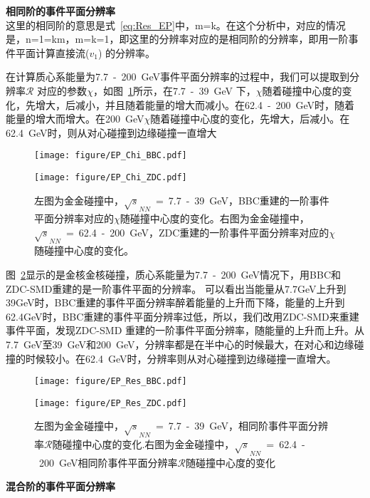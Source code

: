 
\textbf{ 相同阶的事件平面分辨率} \\

这里的相同阶的意思是式~\ref{eq:Res_EP}中，m=k。在这个分析中，对应的情况是，n=1=km，m=k=1，即这里的分辨率对应的是相同阶的分辨率，即用一阶事件平面计算直接流($v_{1}$) 的分辨率。

在计算质心系能量为7.7~-~200~GeV事件平面分辨率的过程中，我们可以提取到分辨率$\mathcal{R}$ 对应的参数$\chi$，如图~\ref{fig:EP_Chi_BBC_ZDC}所示，在7.7~-~39~GeV 下，$\chi$随着碰撞中心度的变化，先增大，后减小，并且随着能量的增大而减小。在62.4~-~200~GeV时，随着能量的增大而增大。在200~GeV$\chi$随着碰撞中心度的变化，先增大，后减小。在62.4~GeV时，则从对心碰撞到边缘碰撞一直增大

\begin{figure}[htbp]
\begin{minipage}[t]{0.5\textwidth}
\centering
\texttt{[image: figure/EP\_Chi\_BBC.pdf]}
\end{minipage}
\begin{minipage}[t]{0.5\textwidth}
\centering
\texttt{[image: figure/EP\_Chi\_ZDC.pdf]}
\end{minipage}
\caption{左图为金金碰撞中，$\sqrt{s}_{NN}$~=~7.7~-~39~GeV，BBC重建的一阶事件平面分辨率对应的$\chi$随碰撞中心度的变化。右图为金金碰撞中，$\sqrt{s}_{NN}$~=~62.4~-~200~GeV，ZDC重建的一阶事件平面分辨率对应的$\chi$随碰撞中心度的变化。}
\label{fig:EP_Chi_BBC_ZDC}
\end{figure}

图~\ref{fig:EP_Res_BBC_ZDC}显示的是金核金核碰撞，质心系能量为7.7~-~200~GeV情况下，用BBC和ZDC-SMD重建的是一阶事件平面的分辨率。
可以看出当能量从7.7GeV上升到39GeV时，BBC重建的事件平面分辨率醉着能量的上升而下降，能量的上升到62.4GeV时，BBC重建的事件平面分辨率过低，所以，我们改用ZDC-SMD来重建事件平面，发现ZDC-SMD 重建的一阶事件平面分辨率，随能量的上升而上升。从7.7~GeV至39~GeV和200~GeV，分辨率都是在半中心的时候最大，在对心和边缘碰撞的时候较小。在62.4~GeV时，分辨率则从对心碰撞到边缘碰撞一直增大。

\begin{figure}[htbp]
\begin{minipage}[t]{0.5\textwidth}
\centering
\texttt{[image: figure/EP\_Res\_BBC.pdf]}
\end{minipage}
\begin{minipage}[t]{0.5\textwidth}
\centering
\texttt{[image: figure/EP\_Res\_ZDC.pdf]}
\end{minipage}
\caption{左图为金金碰撞中，$\sqrt{s}_{NN}$~=~7.7~-~39~GeV，相同阶事件平面分辨率$\mathcal{R}$随碰撞中心度的变化.右图为金金碰撞中，$\sqrt{s}_{NN}$~=~62.4~-~200~GeV相同阶事件平面分辨率$\mathcal{R}$随碰撞中心度的变化}
\label{fig:EP_Res_BBC_ZDC}
\end{figure}
\textbf{ 混合阶的事件平面分辨率} \\


